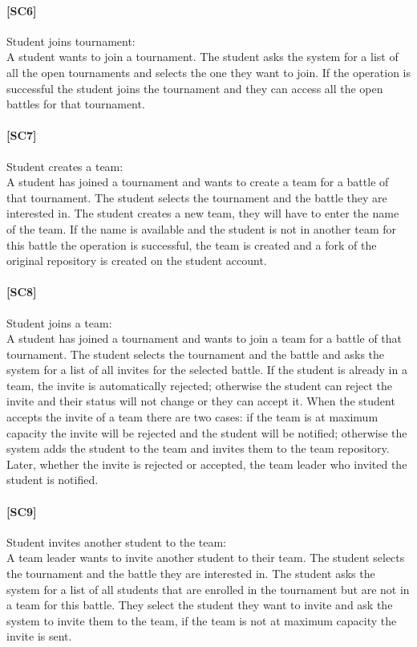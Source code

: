 \documentclass{article}
\begin{document}
\paragraph{[SC6]}Student joins tournament:\\
A student wants to join a tournament. The student asks the system for a list of all the open tournaments and selects the one they want to join. If the operation is successful the student joins the tournament and they can access all the open battles for that tournament.

\paragraph{[SC7]}Student creates a team:\\
A student has joined a tournament and wants to create a team for a battle of that tournament. The student selects the tournament and the battle they are interested in. The student creates a new team, they will have to enter the name of the team. If the name is available and the student is not in another team for this battle the operation is successful, the team is created and a fork of the original repository is created on the student account.

\paragraph{[SC8]}Student joins a team:\\
A student has joined a tournament and  wants to join a team for a battle of that tournament. The student selects the tournament and the battle and asks the system for a list of all invites for the selected battle. If the student is already in a team, the invite is automatically rejected; otherwise the student can reject the invite and their status will not change or they can accept it. When the student accepts the invite of a team there are two cases: if the team is at maximum capacity the invite will be rejected and the student will be notified; otherwise the system adds the student to the team and invites them to the team repository. Later, whether the invite is rejected or accepted, the team leader who invited the student is notified.

\paragraph{[SC9]}Student invites another student to the team:\\
A team leader wants to invite another student to their team. The student selects the 
tournament and the battle they are interested in. The student asks the system for a list of all students that are enrolled in the tournament but are not in a team for this battle. They select the student they want to invite and ask the system to invite them to the team, if the team is not at maximum capacity the invite is sent.
\end{document}
